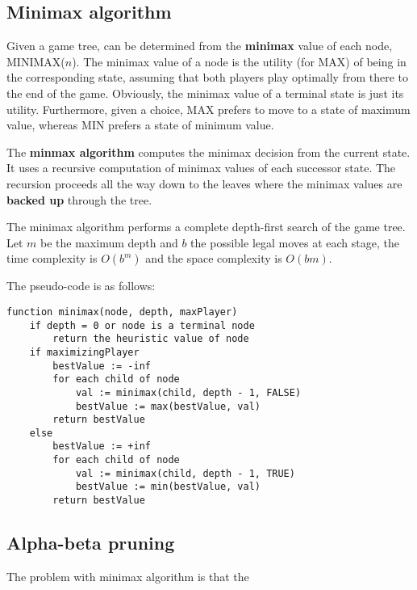 \documentclass[a4paper, 11pt]{article}
\begin{document}
\subsection*{Minimax algorithm}
Given a game tree, can be determined from the \textbf{minimax} value of each node, MINIMAX($n$).
The minimax value of a node is the utility (for MAX) of being in the corresponding state, assuming that both players play optimally
from there to the end of the game. Obviously, the minimax value of a terminal state is just
its utility. Furthermore, given a choice, MAX prefers to move to a state of maximum value,
whereas MIN prefers a state of minimum value.

The \textbf{minmax algorithm} computes the minimax decision from the current state. It uses a recursive computation of minimax values of each successor state. The recursion proceeds all the way down to the leaves where the minimax values are \textbf{backed up} through the tree.

The minimax algorithm performs a complete depth-first search of the game tree. Let $m$ be the maximum depth and $b$ the possible legal moves at each stage, the time complexity is $O(b^m)$ and the space complexity is $O(bm)$.

The pseudo-code is as follows:
\begin{verbatim}
function minimax(node, depth, maxPlayer)
    if depth = 0 or node is a terminal node
        return the heuristic value of node
    if maximizingPlayer
        bestValue := -inf
        for each child of node
            val := minimax(child, depth - 1, FALSE)
            bestValue := max(bestValue, val)
        return bestValue
    else
        bestValue := +inf
        for each child of node
            val := minimax(child, depth - 1, TRUE)
            bestValue := min(bestValue, val)
        return bestValue
\end{verbatim}

\subsection*{Alpha-beta pruning}
The problem with minimax algorithm is that the 
\end{document}
